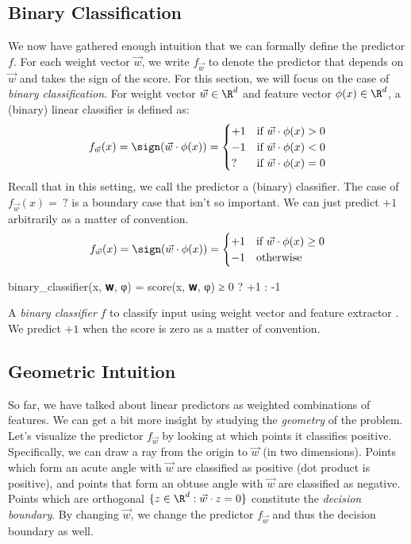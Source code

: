 \subsection{Binary Classification} %
\label{sub:binary_classification}

We now have gathered enough intuition that we can formally define the predictor $f$.
For each weight vector $\vec{w}$, we write $f_{\vec{w}}$ to denote the predictor that depends on $\vec{w}$
and takes the sign of the score.
For this section, we will focus on the case of \textit{binary classification}. %
For weight vector $\vec{w} \in \R^d$ and feature vector $\phi(x) \in \R^d$, a (binary) linear classifier is defined as:
\[
    f_{\vec{w}}(x) = \sign(\vec{w} \cdot \phi(x)) = \begin{cases}
        +1 & \text{if }\vec{w} \cdot \phi(x) > 0\\
        -1 & \text{if }\vec{w} \cdot \phi(x) < 0\\
        \text{?} & \text{if }\vec{w} \cdot \phi(x) = 0
    \end{cases}
\]
Recall that in this setting, we call the predictor a (binary) classifier.
The case of $f_{\vec{w}}(x) =~?$ is a boundary case that isn't so important.
We can just predict $+1$ arbitrarily as a matter of convention.
\[
    f_{\vec{w}}(x) = \sign(\vec{w} \cdot \phi(x)) = \begin{cases}
        +1 & \text{if }\vec{w} \cdot \phi(x) \ge 0\\
        -1 & \text{otherwise}
    \end{cases}
\]
\begin{algorithm}
\begin{juliaverbatim}
binary_classifier(x, 𝐰, φ) = score(x, 𝐰, φ) ≥ 0 ? +1 : -1
\end{juliaverbatim}

\caption{
    \label{alg:binary_classifier}
    A \textit{binary classifier} $f$ to classify input  using weight vector  and feature extractor . We predict $+1$ when the score is zero as a matter of convention.
}
\end{algorithm}


\subsection{Geometric Intuition} %
\label{sub:geometric_intuition}
So far, we have talked about linear predictors as weighted combinations of features.
We can get a bit more insight by studying the \textit{geometry} of the problem.
Let's visualize the predictor $f_{\vec{w}}$ by looking at which points it classifies positive.
Specifically, we can draw a ray from the origin to $\vec{w}$ (in two dimensions).
Points which form an acute angle with $\vec{w}$ are classified as positive (dot product is positive),
and points that form an obtuse angle with $\vec{w}$ are classified as negative.
Points which are orthogonal $\{ z \in \R^d : \vec{w} \cdot z = 0 \}$ constitute the \textit{decision boundary}.
By changing $\vec{w}$, we change the predictor $f_{\vec{w}}$ and thus the decision boundary as well.

